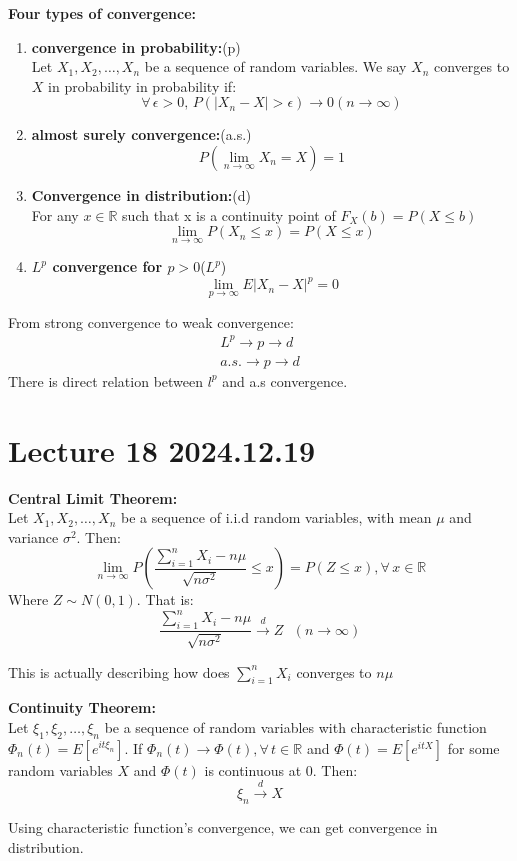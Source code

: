 \documentclass{article}
\begin{document}
\begin{definition}
    \textbf{Four types of convergence:}
    \begin{enumerate}
        \item \textbf{convergence in probability:}(p)\\
        Let $X_1,X_2,\dots,X_n$ be a sequence of random variables. We say $X_n$ converges to $X$ in probability in probability if: 
        \[
        \forall\, \epsilon > 0, \, P(|X_n - X| > \epsilon) \rightarrow 0 (n \rightarrow \infty)
        \]
        \item \textbf{almost surely convergence:}(a.s.)
        \[
            P(\lim_{n \rightarrow \infty} X_n = X) = 1
        \]
        \item \textbf{Convergence in distribution:}(d)\\
        For any $x \in \mathbb{R}$  such that x is a continuity point of $F_X(b) = P(X \leq b)$
        \[
            \lim_{n \rightarrow \infty}P(X_n \leq x) = P(X \leq x)
        \]

        \item \textbf{$L^p$ convergence for $p > 0$}($L^p$)
        \[
            \lim_{p \rightarrow \infty}E|X_n - X|^p = 0
        \]
    \end{enumerate}
    From strong convergence to weak convergence:
    \begin{align*}
        L^p \rightarrow p \rightarrow d \\
        a.s. \rightarrow p \rightarrow d
    \end{align*}
    There is direct relation between $l^p$ and a.s convergence.
\end{definition}


\section{Lecture 18 2024.12.19}
\begin{theorem}
    \textbf{Central Limit Theorem:}\\
    Let $X_1,X_2,\dots,X_n$ be a sequence of i.i.d random variables, with mean $\mu$ and variance $\sigma^2$. Then:
    \[
        \lim_{n \rightarrow \infty} P(\frac{\sum^n_{i=1}X_i - n\mu}{\sqrt{n\sigma^2}} \leq x) = P(Z \leq x), \forall \, x\in \mathbb{R}
    \]
    Where $Z \sim N(0,1)$. That is:
    \[
        \frac{\sum^n_{i=1}X_i - n\mu}{\sqrt{n\sigma^2}} \xrightarrow{d} Z \text{ }(n \rightarrow \infty)
    \]
\end{theorem}
This is actually describing how does $\sum^n_{i=1}X_i $ converges to $n\mu$
\begin{theorem}
    \textbf{Continuity Theorem:}\\
    Let $\xi_1,\xi_2,\dots,\xi_n$ be a sequence of random variables with characteristic function $\Phi_n(t) = E[e^{it\xi_n}]$. If $\Phi_n(t) \rightarrow \Phi(t),\forall\,t\in\mathbb{R}$ and $\Phi(t) = E[e^{itX}]$ for some random variables $X$ and $\Phi(t)$ is continuous at 0. Then:
    \[
        \xi_n \xrightarrow{d} X
    \]
\end{theorem}
Using characteristic function's convergence, we can get convergence in distribution.
\end{document}

